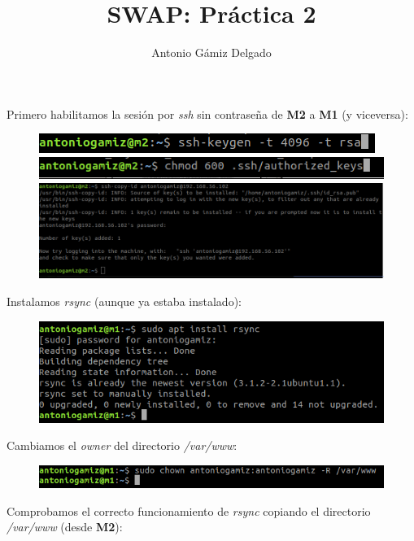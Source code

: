 \documentclass[12pt]{article}
\title{SWAP: Práctica 2}
\author{
        Antonio Gámiz Delgado
}
\begin{document}
\maketitle

Primero habilitamos la sesión por \textit{ssh} sin contraseña de \textbf{M2} a \textbf{M1} (y viceversa):

\begin{figure}[H]
   \center
  \includegraphics[scale=0.5]{img/_1.png}\\
  \includegraphics[scale=0.5]{img/_2.png}\\
  \includegraphics[scale=0.5]{img/1.png}
\end{figure}

Instalamos \textit{rsync} (aunque ya estaba instalado):

\begin{figure}[H]
   \center
  \includegraphics[scale=0.5]{img/2.png}
\end{figure}

Cambiamos el \textit{owner} del directorio \textit{/var/www}:

\begin{figure}[H]
   \center
  \includegraphics[scale=0.5]{img/3.png}
\end{figure}

Comprobamos el correcto funcionamiento de \textit{rsync} copiando el directorio \textit{/var/www} (desde \textbf{M2}):
\end{document}
